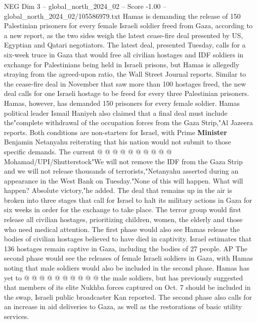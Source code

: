 \begin{textsample}{NEG Dim 3 – global\_north\_2024\_02 – Score -1.00 – global\_north\_2024\_02/105586979.txt}  \label{ex:f3_neg_204}
Hamas is demanding the release of 150 Palestinian prisoners for every female Israeli soldier freed from Gaza, according to a new report, as the two sides weigh the latest cease-fire deal presented by US, Egyptian and Qatari negotiators.
The latest deal, presented Tuesday, calls for a six-week truce in Gaza that would free all civilian hostages and IDF soldiers in exchange for Palestinians being held in Israeli prisons, but Hamas is allegedly straying from the agreed-upon ratio, the Wall Street Journal reports.
Similar to the cease-fire deal in November that saw more than 100 hostages freed, the new deal calls for one Israeli hostage to be freed for every three Palestinian prisoners.
Hamas, however, has demanded 150 prisoners for every female soldier.
Hamas political leader Ismail Haniyeh also claimed that a final deal must include the"complete withdrawal of the occupation forces from the Gaza Strip,"Al Jazeera reports.
Both conditions are non-starters for Israel, with Prime \textbf{Minister} Benjamin Netanyahu reiterating that his nation would not submit to those specific demands.
The current @ @ @ @ @ @ @ @ @ @ Mohamad/UPI/Shutterstock"We will not remove the IDF from the Gaza Strip and we will not release thousands of terrorists,"Netanyahu asserted during an appearance in the West Bank on Tuesday."None of this will happen.
What will happen?
Absolute victory,"he added.
The deal that remains up in the air is broken into three stages that call for Israel to halt its military actions in Gaza for six weeks in order for the exchange to take place.
The terror group would first release all civilian hostages, prioritizing children, women, the elderly and those who need medical attention.
The first phase would also see Hamas release the bodies of civilian hostages believed to have died in captivity.
Israel estimates that 136 hostages remain captive in Gaza, including the bodies of 27 people.
AP The second phase would see the releases of female Israeli soldiers in Gaza, with Hamas noting that male soldiers would also be included in the second phase.
Hamas has yet to @ @ @ @ @ @ @ @ @ @ the male soldiers, but has previously suggested that members of its elite Nukhba forces captured on Oct. 7 should be included in the swap, Israeli public broadcaster Kan reported.
The second phase also calls for an increase in aid deliveries to Gaza, as well as the restorations of basic utility services.

\end{textsample}
